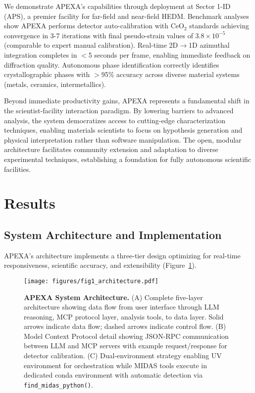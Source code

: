\documentclass[11pt]{article}
\begin{document}
We demonstrate APEXA's capabilities through deployment at Sector 1-ID (APS), a premier facility for far-field and near-field HEDM. Benchmark analyses show APEXA performs detector auto-calibration with CeO$_2$ standards achieving convergence in 3-7 iterations with final pseudo-strain values of $3.8 \times 10^{-5}$ (comparable to expert manual calibration). Real-time 2D$\rightarrow$1D azimuthal integration completes in $<$5 seconds per frame, enabling immediate feedback on diffraction quality. Autonomous phase identification correctly identifies crystallographic phases with $>$95\% accuracy across diverse material systems (metals, ceramics, intermetallics).

Beyond immediate productivity gains, APEXA represents a fundamental shift in the scientist-facility interaction paradigm. By lowering barriers to advanced analysis, the system democratizes access to cutting-edge characterization techniques, enabling materials scientists to focus on hypothesis generation and physical interpretation rather than software manipulation. The open, modular architecture facilitates community extension and adaptation to diverse experimental techniques, establishing a foundation for fully autonomous scientific facilities.

\section{Results}

\subsection{System Architecture and Implementation}

APEXA's architecture implements a three-tier design optimizing for real-time responsiveness, scientific accuracy, and extensibility (Figure~\ref{fig:architecture}).

\begin{figure}[htbp]
\centering
\texttt{[image: figures/fig1\_architecture.pdf]}
\caption{\textbf{APEXA System Architecture.} (A) Complete five-layer architecture showing data flow from user interface through LLM reasoning, MCP protocol layer, analysis tools, to data layer. Solid arrows indicate data flow; dashed arrows indicate control flow. (B) Model Context Protocol detail showing JSON-RPC communication between LLM and MCP servers with example request/response for detector calibration. (C) Dual-environment strategy enabling UV environment for orchestration while MIDAS tools execute in dedicated conda environment with automatic detection via \texttt{find\_midas\_python()}.}
\label{fig:architecture}
\end{figure}
\end{document}
